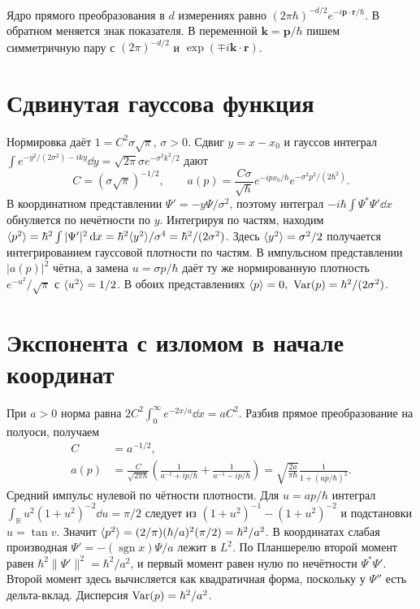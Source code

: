 \documentclass[11pt,a4paper]{article}
\begin{document}

Ядро прямого преобразования в \(d\) измерениях равно
\((2\pi\hbar)^{-d/2}e^{-i\mathbf p\cdot\mathbf r/\hbar}\).
В обратном меняется знак показателя. В переменной
\(\mathbf k=\mathbf p/\hbar\) пишем симметричную пару с
\((2\pi)^{-d/2}\) и \(\exp(\mp i\mathbf k\cdot\mathbf r)\).

\section{Сдвинутая гауссова функция}

Нормировка даёт \(1=C^2\sigma\sqrt\pi\), \(\sigma>0\).
Сдвиг \(y=x-x_0\) и гауссов интеграл
\(\int e^{-y^2/(2\sigma^2)-iky}\dd y
=\sqrt{2\pi}\sigma e^{-\sigma^2 k^2/2}\) дают
\[
 C=(\sigma\sqrt\pi)^{-1/2},\qquad
 a(p)=\frac{C\sigma}{\sqrt\hbar}
       e^{-ipx_0/\hbar}e^{-\sigma^2p^2/(2\hbar^2)}.
\]
В координатном представлении \(\Psi'=-y\Psi/\sigma^2\), поэтому
интеграл \(-i\hbar\int\Psi^*\Psi'\dd x\) обнуляется по нечётности
по \(y\). Интегрируя по частям, находим
\(\langle p^2\rangle=\hbar^2\int|\Psi'|^2\mathop{}\!\mathrm{d} x
=\hbar^2\langle y^2\rangle/\sigma^4=\hbar^2/(2\sigma^2)\).
Здесь \(\langle y^2\rangle=\sigma^2/2\) получается интегрированием
гауссовой плотности по частям.
В импульсном представлении \(|a(p)|^2\) чётна, а замена
\(u=\sigma p/\hbar\) даёт ту же нормированную плотность
\(e^{-u^2}/\sqrt\pi\) с \(\langle u^2\rangle=1/2\). В обоих представлениях
\(\avg{p}=0,\ \Var(p)=\hbar^2/(2\sigma^2)\).

\section{Экспонента с изломом в начале координат}

При \(a>0\) норма равна \(2C^2\int_0^\infty e^{-2x/a}\dd x=aC^2\).
Разбив прямое преобразование на полуоси, получаем
\begin{align*}
 C&=a^{-1/2},\\
 a(p)&=\frac{C}{\sqrt{2\pi\hbar}}
   \left(\frac1{a^{-1}+ip/\hbar}+\frac1{a^{-1}-ip/\hbar}\right)
   =\sqrt{\frac{2a}{\pi\hbar}}\frac1{1+(ap/\hbar)^2}.
\end{align*}
Средний импульс нулевой по чётности плотности.
Для \(u=ap/\hbar\) интеграл
\(\int_\mathbb R u^2(1+u^2)^{-2}\dd u=\pi/2\) следует из
\((1+u^2)^{-1}-(1+u^2)^{-2}\) и подстановки \(u=\tan v\).
Значит \(\langle p^2\rangle=(2/\pi)(\hbar/a)^2(\pi/2)=\hbar^2/a^2\).
В координатах слабая производная
\(\Psi'=-(\operatorname{sgn}x)\Psi/a\) лежит в \(L^2\).
По Планшерелю второй момент равен
\(\hbar^2\|\Psi'\|^2=\hbar^2/a^2\), и первый момент равен нулю
по нечётности \(\Psi^*\Psi'\). Второй момент здесь вычисляется
как квадратичная форма, поскольку у \(\Psi''\) есть дельта-вклад.
Дисперсия \(\operatorname{Var}(p)=\hbar^2/a^2\).
\end{document}
